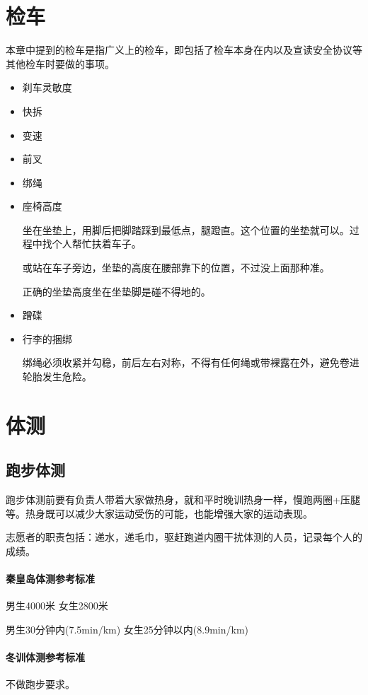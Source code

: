 \documentclass{ctexbook}
\begin{document}
\section{检车}
本章中提到的检车是指广义上的检车，即包括了检车本身在内以及宣读安全协议等其他检车时要做的事项。
\begin{itemize}

\item 刹车灵敏度

\item 快拆

\item 变速

\item 前叉

\item 绑绳

\item 座椅高度

坐在坐垫上，用脚后把脚踏踩到最低点，腿蹬直。这个位置的坐垫就可以。过程中找个人帮忙扶着车子。

或站在车子旁边，坐垫的高度在腰部靠下的位置，不过没上面那种准。

正确的坐垫高度坐在坐垫脚是碰不得地的。

\item 蹭碟

\item 行李的捆绑

绑绳必须收紧并勾稳，前后左右对称，不得有任何绳或带裸露在外，避免卷进轮胎发生危险。
\end{itemize}
\section{体测}

\subsection{跑步体测}
跑步体测前要有负责人带着大家做热身，就和平时晚训热身一样，慢跑两圈+压腿等。热身既可以减少大家运动受伤的可能，也能增强大家的运动表现。

志愿者的职责包括：递水，递毛巾，驱赶跑道内圈干扰体测的人员，记录每个人的成绩。
\paragraph{秦皇岛体测参考标准}

男生4000米 女生2800米

男生30分钟内(7.5min/km) 女生25分钟以内(8.9min/km)
\paragraph{冬训体测参考标准}
不做跑步要求。
\end{document}

